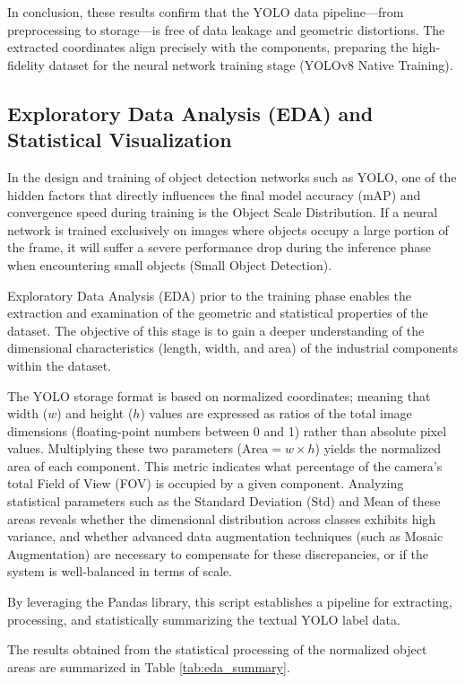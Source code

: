 \documentclass{article}
\begin{document}
In conclusion, these results confirm that the YOLO data pipeline—from preprocessing to storage—is free of data leakage and geometric distortions. The extracted coordinates align precisely with the components, preparing the high-fidelity dataset for the neural network training stage (YOLOv8 Native Training).


\subsection{Exploratory Data Analysis (EDA) and Statistical Visualization}

In the design and training of object detection networks such as YOLO, one of the hidden factors that directly influences the final model accuracy (mAP) and convergence speed during training is the Object Scale Distribution. If a neural network is trained exclusively on images where objects occupy a large portion of the frame, it will suffer a severe performance drop during the inference phase when encountering small objects (Small Object Detection).

Exploratory Data Analysis (EDA) prior to the training phase enables the extraction and examination of the geometric and statistical properties of the dataset. The objective of this stage is to gain a deeper understanding of the dimensional characteristics (length, width, and area) of the industrial components within the dataset.

The YOLO storage format is based on normalized coordinates; meaning that width ($w$) and height ($h$) values are expressed as ratios of the total image dimensions (floating-point numbers between 0 and 1) rather than absolute pixel values. Multiplying these two parameters ($\text{Area} = w \times h$) yields the normalized area of each component. This metric indicates what percentage of the camera's total Field of View (FOV) is occupied by a given component. Analyzing statistical parameters such as the Standard Deviation (Std) and Mean of these areas reveals whether the dimensional distribution across classes exhibits high variance, and whether advanced data augmentation techniques (such as Mosaic Augmentation) are necessary to compensate for these discrepancies, or if the system is well-balanced in terms of scale.

By leveraging the Pandas library, this script establishes a pipeline for extracting, processing, and statistically summarizing the textual YOLO label data.

The results obtained from the statistical processing of the normalized object areas are summarized in Table \ref{tab:eda_summary}.
\end{document}
